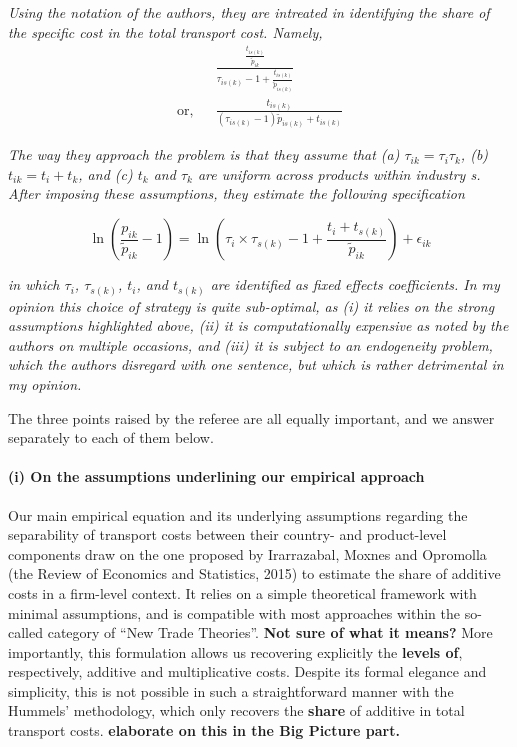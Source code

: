 \documentclass[a4paper,12pt]{article}
\begin{document}
\textit{Using the notation of the authors, they are intreated
in identifying the share of the specific cost in the total transport cost. Namely,}
\begin{eqnarray*}
&& \frac{\frac{t_{is(k)}}{\tilde{p}_{ik}}}{\tau_{is(k)}-1 + \frac{t_{is(k)}}{\tilde{p}_{is(k)}}} \\
\text{or,} &&\frac{t_{is(k)}}{(\tau_{is(k)}-1)\tilde{p}_{is(k)} + t_{is(k)}}
\end{eqnarray*}

\textit{The way they approach the problem is that they assume that (a) $\tau_{ik} = \tau_i\tau_{k}$,
(b) $t_{ik} = t_i +t_k$, and (c) $t_k$ and $\tau_k$ are uniform across products within industry
s. After imposing these assumptions, they estimate the following specification}

\begin{equation}
\ln\left(\frac{p_{ik}}{\widetilde{p}_{ik}}-1 \right)= \ln \left(\tau_{i} \times \tau_{s(k)} -1+\frac{t_{i} + t_{s(k)}}{\widetilde{p}_{ik}} \right) + \epsilon_{ik} \label{eq:equation0}
\end{equation}

\textit{in which $\tau_i$, $\tau_{s(k)}$, $t_i$, and $t_{s(k)}$ are identified as fixed effects coefficients.
In my opinion this choice of strategy is quite sub-optimal, as (i) it relies on
the strong assumptions highlighted above, (ii) it is computationally expensive
as noted by the authors on multiple occasions, and (iii) it is subject to an
endogeneity problem, which the authors disregard with one sentence, but which
is rather detrimental in my opinion.}

The three points raised by the referee are all equally important, and we answer separately to each of them below.



\paragraph{(i) On the assumptions underlining our empirical approach}
Our main empirical equation and its underlying assumptions regarding the separability of transport costs between their country- and product-level components draw on the one proposed by Irarrazabal, Moxnes and Opromolla (the Review of Economics and Statistics, 2015) to estimate the share of additive costs in a firm-level context. It relies on a simple theoretical framework with minimal assumptions, and is compatible with most approaches within the so-called category of ``New Trade Theories''. \textbf{Not sure of what it means? } More importantly, this formulation allows us recovering explicitly the \textbf{levels of}, respectively, additive and multiplicative costs. Despite its formal elegance and simplicity, this is not possible in such a straightforward manner with the Hummels' methodology, which only recovers the \textbf{share} of additive in total transport costs. \textbf{elaborate on this in the Big Picture part.}
\end{document}
